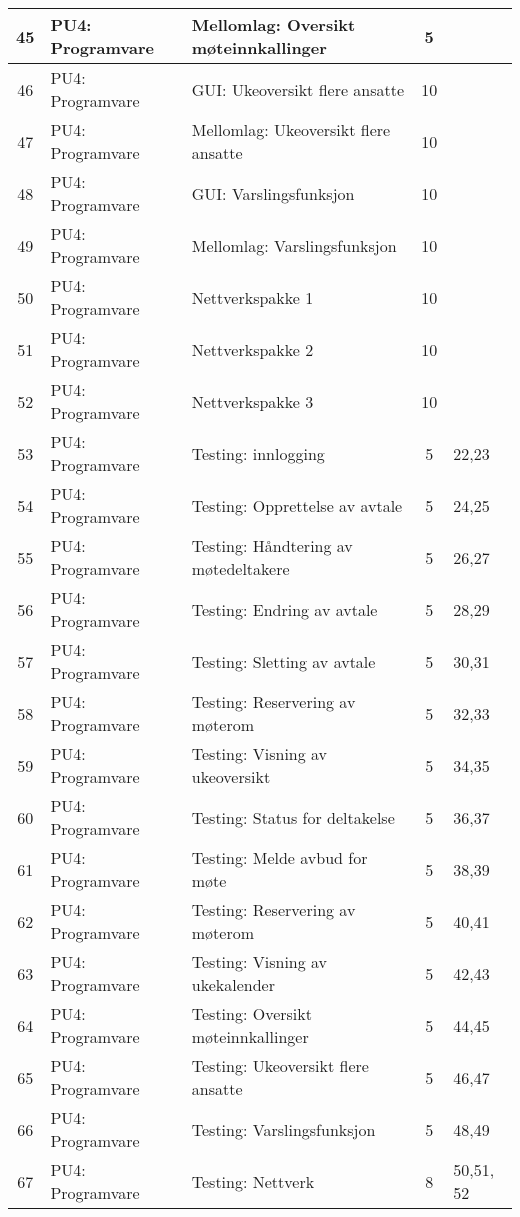 \begin{longtable}[l]{|c|l|l|c|p{0.7cm}|}
	45 & PU4: Programvare & Mellomlag: Oversikt møteinnkallinger  & 5 & \\ \hline
	46 & PU4: Programvare & GUI: Ukeoversikt flere ansatte & 10 & \\ \hline
	47 & PU4: Programvare & Mellomlag: Ukeoversikt flere ansatte  & 10 & \\ \hline
	48 & PU4: Programvare & GUI: Varslingsfunksjon & 10 & \\ \hline
	49 & PU4: Programvare & Mellomlag: Varslingsfunksjon & 10 & \\ \hline
	50 & PU4: Programvare & Nettverkspakke 1 & 10 & \\ \hline
	51 & PU4: Programvare & Nettverkspakke 2 & 10 & \\ \hline
	52 & PU4: Programvare & Nettverkspakke 3 & 10 & \\ \hline
	53 & PU4: Programvare & Testing: innlogging & 5 & 22,23\\ \hline
	54 & PU4: Programvare & Testing: Opprettelse av avtale & 5 & 24,25 \\ \hline
	55 & PU4: Programvare & Testing: Håndtering av møtedeltakere & 5 &26,27 \\ \hline
	56 & PU4: Programvare & Testing: Endring av avtale & 5 & 28,29\\  \hline
	57 & PU4: Programvare & Testing: Sletting av avtale & 5 & 30,31\\ \hline
	58 & PU4: Programvare & Testing: Reservering av møterom & 5 &32,33 \\ \hline
	59 & PU4: Programvare & Testing: Visning av ukeoversikt & 5 &34,35 \\ \hline
	60 & PU4: Programvare & Testing: Status for deltakelse & 5 &36,37 \\ \hline
	61 & PU4: Programvare & Testing: Melde avbud for møte & 5 &38,39 \\ \hline
	62 & PU4: Programvare & Testing: Reservering av møterom & 5 &40,41 \\ \hline
	63 & PU4: Programvare & Testing: Visning av ukekalender & 5 &42,43 \\ \hline
	64 & PU4: Programvare & Testing: Oversikt møteinnkallinger & 5 &44,45 \\ \hline
	65 & PU4: Programvare & Testing: Ukeoversikt flere ansatte & 5 & 46,47\\ \hline
	66 & PU4: Programvare & Testing: Varslingsfunksjon & 5 &48,49 \\ \hline
	67 & PU4: Programvare & Testing: Nettverk & 8 &50,51, 52 \\ \hline

\end{longtable}
